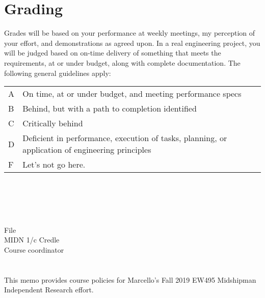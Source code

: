 \documentclass[10pt,courier]{navymemo}
\begin{document}
\section{Grading}
Grades will be based on your performance at weekly meetings, my perception of your effort, and demonstrations as agreed upon.  In a
\clearpage\noindent real engineering project, you will be judged based on on-time delivery of something that meets the requirements, at or under budget, along with complete documentation. The following general guidelines apply: 
\begin{center}
\begin{tabular}{lp{5in}}
A & On time, at or under budget, and meeting performance specs \\
B & Behind, but with a path to completion identified \\
C & Critically behind \\
D & Deficient in performance, execution of tasks, planning, or application of engineering principles \\
F & Let's not go here. \\
\end{tabular}
\end{center}

\noclosing{}\\
\noindent\hspace*{4in}
\signature{D Evangelista}

\noindent\hspace*{4in}{207 Maury Hall}\\
\hspace*{4in}{(410) 293-6132}\\

\copyto{}
File\\
MIDN 1/c Credle\\
Course coordinator


\navyrecordnote
\thispagestyle{empty}


\navyrecordnotesubjline

\section{} This memo provides course policies for Marcello's Fall 2019 EW495 Midshipman Independent Research effort.
\end{document}
